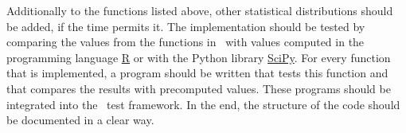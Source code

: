 		Additionally to the functions listed above, other statistical distributions should be added, if the time permits it. The implementation should be tested by comparing the values from the functions in \setlx\ with values computed in the programming language \href{https://en.wikipedia.org/wiki/R_(programming_language)}{R} or with the Python library \href{https://www.scipy.org}{SciPy}. For every function that is implemented, a program should be written that tests this function and that compares the results with precomputed values. These programs should be integrated into the \setlx\ test framework. In the end, the structure of the code should be documented in a clear way.

